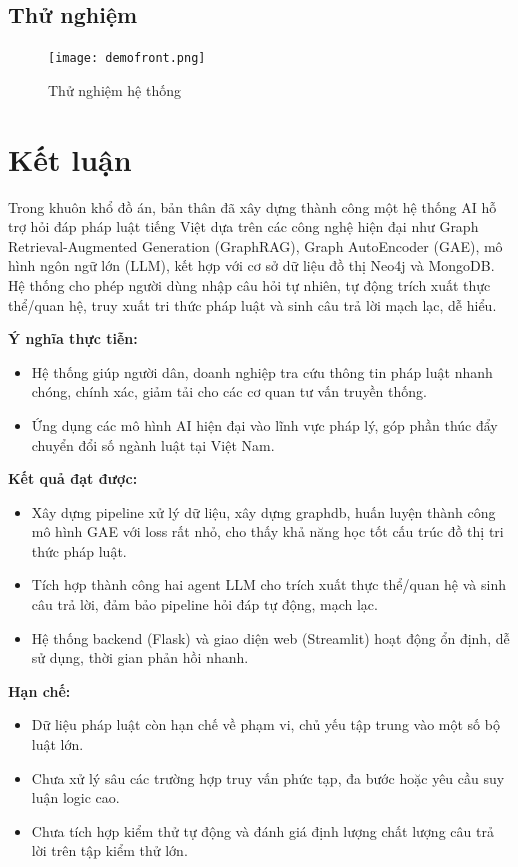 \documentclass[a4paper]{article}
\begin{document}
\subsection{Thử nghiệm}
\begin{figure}[H]
    \centering
    \texttt{[image: demofront.png]}
    \caption{Thử nghiệm hệ thống}

\end{figure}

\newpage
\section{Kết luận}

Trong khuôn khổ đồ án, bản thân đã xây dựng thành công một hệ thống AI hỗ trợ hỏi đáp pháp luật tiếng Việt dựa trên các công nghệ hiện đại như Graph Retrieval-Augmented Generation (GraphRAG), Graph AutoEncoder (GAE), mô hình ngôn ngữ lớn (LLM), kết hợp với cơ sở dữ liệu đồ thị Neo4j và MongoDB. Hệ thống cho phép người dùng nhập câu hỏi tự nhiên, tự động trích xuất thực thể/quan hệ, truy xuất tri thức pháp luật và sinh câu trả lời mạch lạc, dễ hiểu.

\textbf{Ý nghĩa thực tiễn:}
\begin{itemize}
    \item Hệ thống giúp người dân, doanh nghiệp tra cứu thông tin pháp luật nhanh chóng, chính xác, giảm tải cho các cơ quan tư vấn truyền thống.
    \item Ứng dụng các mô hình AI hiện đại vào lĩnh vực pháp lý, góp phần thúc đẩy chuyển đổi số ngành luật tại Việt Nam.
\end{itemize}

\textbf{Kết quả đạt được:}
\begin{itemize}
    \item Xây dựng pipeline xử lý dữ liệu, xây dựng graphdb, huấn luyện thành công mô hình GAE với loss rất nhỏ, cho thấy khả năng học tốt cấu trúc đồ thị tri thức pháp luật.
    \item Tích hợp thành công hai agent LLM cho trích xuất thực thể/quan hệ và sinh câu trả lời, đảm bảo pipeline hỏi đáp tự động, mạch lạc.
    \item Hệ thống backend (Flask) và giao diện web (Streamlit) hoạt động ổn định, dễ sử dụng, thời gian phản hồi nhanh.
\end{itemize}

\textbf{Hạn chế:}
\begin{itemize}
    \item Dữ liệu pháp luật còn hạn chế về phạm vi, chủ yếu tập trung vào một số bộ luật lớn.
    \item Chưa xử lý sâu các trường hợp truy vấn phức tạp, đa bước hoặc yêu cầu suy luận logic cao.
    \item Chưa tích hợp kiểm thử tự động và đánh giá định lượng chất lượng câu trả lời trên tập kiểm thử lớn.
\end{itemize}
\end{document}
